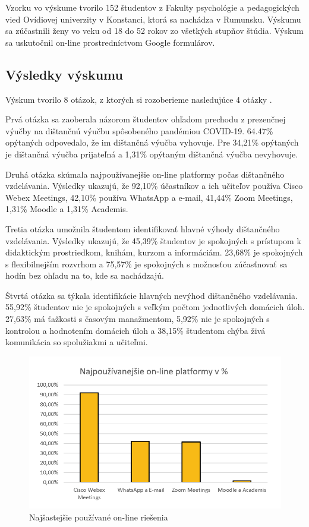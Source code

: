 \documentclass[10pt,oneside,slovak,a4paper]{article}
\begin{document}
Vzorku vo výskume tvorilo 152 študentov z Fakulty psychológie a pedagogických vied Ovídiovej univerzity v Konstanci, ktorá sa nachádza v Rumunsku.
Výskumu sa zúčastnili ženy vo veku od 18 do 52 rokov zo všetkých stupňov štúdia.
Výskum sa uskutočnil on-line prostredníctvom Google formulárov. 

\subsection{Výsledky výskumu}
Výskum tvorilo 8 otázok, z ktorých si rozoberieme nasledujúce 4 otázky \cite{covid19}.

Prvá otázka sa zaoberala názorom študentov ohľadom prechodu z prezenčnej výučby na dištančnú výučbu spôsobeného pandémiou COVID-19.
64.47\% opýtaných odpovedalo, že im dištančná výučba vyhovuje. Pre 34,21\% opýtaných je dištančná výučba prijateľná a 1,31\% opýtaným dištančná výučba nevyhovuje.

Druhá otázka skúmala najpoužívanejšie on-line platformy počas dištančného vzdelávania.
Výsledky ukazujú, že 92,10\% účastníkov a ich učiteľov používa Cisco Webex Meetings, 42,10\% používa WhatsApp a e-mail, 41,44\% Zoom Meetings, 1,31\% Moodle a 1,31\% Academis.

Tretia otázka umožnila študentom identifikovať hlavné výhody dištančného vzdelávania.
Výsledky ukazujú, že 45,39\% študentov je spokojných s prístupom k didaktickým prostriedkom, knihám, kurzom a informáciám. 23,68\% je spokojných s flexibilnejším rozvrhom
a 75,57\% je spokojných s možnosťou zúčasťnovať sa hodín bez ohľadu na to, kde sa nachádzajú.

Štvrtá otázka sa týkala identifikácie hlavných nevýhod dištančného vzdelávania. 55,92\% študentov nie je spokojných s veľkým počtom jednotlivých domácich úloh.
27,63\% má ťažkosti s časovým manažmentom, 5,92\% nie je spokojných s kontrolou a hodnotením domácich úloh a 38,15\% študentom chýba živá komunikácia so spolužiakmi a učiteľmi.

\begin{figure}[h]
	\centering
	\includegraphics[width=1\textwidth]{graf1.png}
	\caption{Najšastejšie používané on-line riešenia\cite{covid19}}
	\label{Graf1}
\end{figure}
\end{document}
